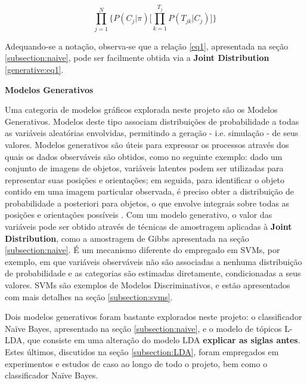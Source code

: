\begin{equation}
\label{generative:eq1}
\ensuremath{\prod_{j=1}^{N} \bigg\{P(C_j|\pi)\bigg[\prod_{k=1}^{T_j}P(T_{jk}|C_j)\bigg]\bigg\}}  
\end{equation} 

Adequando-se a notação, observa-se que a relação \ref{eq1}, apresentada na seção \ref{subsection:naive}, pode ser facilmente obtida via a \textbf{Joint Distribution} \ref{generative:eq1}.

\textbf{Modelos Generativos} 

Uma categoria de modelos gráficos explorada neste projeto são os Modelos Generativos. Modelos deste tipo associam distribuições de probabilidade a todas as variáveis aleatórias envolvidas, permitindo a geração - i.e. simulação - de seus valores. Modelos generativos são úteis para expressar os processos através dos quais os dados observáveis são obtidos, como no seguinte exemplo: dado um conjunto de imagens de objetos, variáveis latentes podem ser utilizadas para representar suas posições e orientações; em seguida, para identificar o objeto contido em uma imagem particular observada, é preciso obter a distribuição de probabilidade a posteriori para objetos, o que envolve integrais sobre todas as posições e orientações possíveis \cite{bishop}. Com um modelo generativo, o valor das variáveis pode ser obtido através de técnicas de amostragem aplicadas à \textbf{Joint Distribution}, como a amostragem de Gibbs apresentada na seção \ref{subsection:naive}. É um mecanismo diferente do empregado em SVMs, por exemplo, em que variáveis observáveis não são associadas a nenhuma distribuição de probabilidade e as categorias são estimadas diretamente, condicionadas a seus valores. SVMs são exemplos de Modelos Discriminativos, e estão apresentados com mais detalhes na seção \ref{subsection:svms}.

Dois modelos generativos foram bastante explorados neste projeto: o classificador Naïve Bayes, apresentado na seção \ref{subsection:naive}, e o modelo de tópicos L-LDA, que consiste em uma alteração do modelo LDA \textbf{explicar as siglas antes}. Estes últimos, discutidos na seção \ref{subsection:LDA}, foram empregados em experimentos e estudos de caso ao longo de todo o projeto, bem como o classificador Naïve Bayes.





